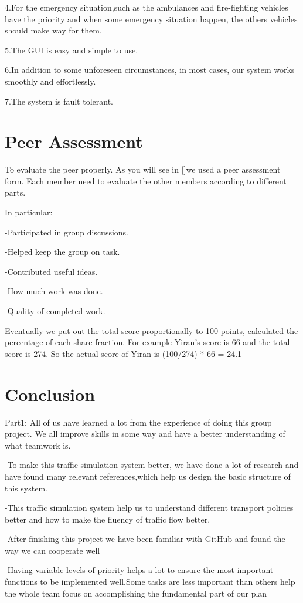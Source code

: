 \documentclass[12pt]{amsart}
\begin{document}
4.For the emergency situation,such as the ambulances and fire-fighting vehicles have the priority and when some emergency situation happen, the others vehicles should make way for them.

5.The GUI is easy and simple to use.

6.In addition to some unforeseen circumstances, in most cases, our system works smoothly and effortlessly.

7.The system is fault tolerant.

\section{Peer Assessment}
To evaluate the peer properly. As you will see in []we used a peer assessment form. Each member need to evaluate the other members according to different parts. 

In particular:

-Participated in group discussions.

-Helped keep the group on task.

-Contributed useful ideas.

-How much work was done.

-Quality of completed work.

Eventually we put out the total score proportionally to 100 points, calculated the percentage of each share fraction. For example Yiran's score is 66 and the total score is 274. So the actual score of Yiran is (100/274) * 66 = 24.1

\section{Conclusion}
Part1: All of us have learned a lot from the experience of doing this group project. We all improve skills in some way and have a better understanding of what teamwork is.

-To make this traffic simulation system better, we have done a lot of research and have found  many relevant references,which help us design the basic structure of this system.

-This traffic simulation system help us to understand different transport policies better and how to make the fluency of traffic flow better.

-After finishing this project we have been familiar with GitHub and found the way we can cooperate well

-Having variable levels of priority helps a lot to ensure the most important functions to be implemented well.Some tasks are less important than others help the whole team focus on accomplishing the fundamental part of our plan
\end{document}
